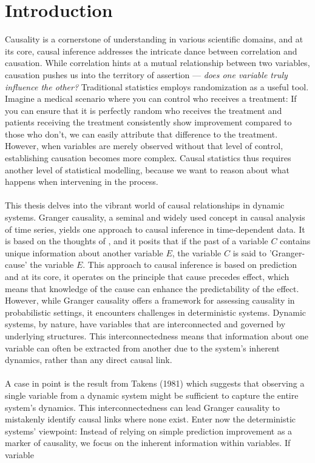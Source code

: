 \documentclass[11pt, a4paper]{memoir}
\theoremstyle{break}
\theoremstyle{break}
\theoremstyle{nonumberplain}
\begin{document}
\section*{Introduction}
Causality is a cornerstone of understanding in various scientific domains, and at its core, causal inference addresses the intricate dance between correlation and causation. While correlation hints at a mutual relationship between two variables, causation pushes us into the territory of assertion — \textit{does one variable truly influence the other?} Traditional statistics employs randomization as a useful tool. Imagine a medical scenario where you can control who receives a treatment: If you can ensure that it is perfectly random who receives the treatment and patients receiving the treatment consistently show improvement compared to those who don't, we can easily attribute that difference to the treatment. However, when variables are merely observed without that level of control, establishing causation becomes more complex. Causal statistics thus requires another level of statistical modelling, because we want to reason about what happens when intervening in the process.\\\\
This thesis delves into the vibrant world of causal relationships in dynamic systems. Granger causality, a seminal and widely used concept in causal analysis of time series, yields one approach to causal inference in time-dependent data. It is based on the thoughts of \cite{Granger}, and it posits that if the past of a variable $C$ contains unique information about another variable $E$, the variable $C$ is said to 'Granger-cause' the variable $E$. This approach to causal inference is based on prediction and at its core, it operates on the principle that cause precedes effect, which means that knowledge of the cause can enhance the predictability of the effect. However, while Granger causality offers a framework for assessing causality in probabilistic settings, it encounters challenges in deterministic systems. Dynamic systems, by nature, have variables that are interconnected and governed by underlying structures. This interconnectedness means that information about one variable can often be extracted from another due to the system's inherent dynamics, rather than any direct causal link.\\\\
A case in point is the result from Takens (1981) which suggests that observing a single variable from a dynamic system might be sufficient to capture the entire system's dynamics. This interconnectedness can lead Granger causality to mistakenly identify causal links where none exist. Enter now the deterministic systems' viewpoint: Instead of relying on simple prediction improvement as a marker of causality, we focus on the inherent information within variables. If variable 
\end{document}
